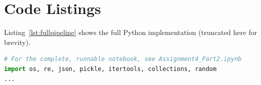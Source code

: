 \documentclass[12pt]{article}
\begin{document}
\appendix
\section{Code Listings}
Listing~\ref{lst:fullpipeline} shows the full Python implementation (truncated here for brevity).

\begin{lstlisting}[language=Python, caption={Main pipeline script.}, label={lst:fullpipeline}]
# For the complete, runnable notebook, see Assignment4_Part2.ipynb
import os, re, json, pickle, itertools, collections, random
...
\end{lstlisting}
\end{document}
